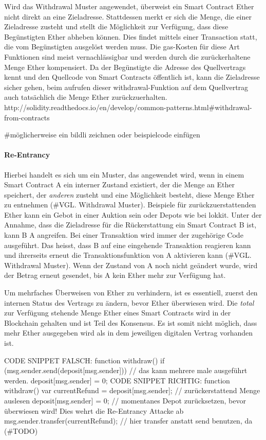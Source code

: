 Wird das Withdrawal Muster angewendet, überweist ein Smart Contract Ether nicht direkt an eine Zieladresse. Stattdessen merkt er sich die Menge, die einer Zieladresse zusteht und stellt die Möglichkeit zur Verfügung, dass diese Begünstigten Ether abheben können. Dies findet mittels einer Transaction statt, die vom Begünstigten ausgelöst werden muss. Die gas-Kosten für diese Art Funktionen sind meist vernachlässigbar und werden durch die zurückerhaltene Menge Ether kompensiert. Da der Begünstigte die Adresse des Quellvertrags kennt und den Quellcode von Smart Contracts öffentlich ist, kann die Zieladresse sicher gehen, beim aufrufen dieser withdrawal-Funktion auf dem Quellvertrag auch tatsächlich die Menge Ether zurückzuerhalten.
http://solidity.readthedocs.io/en/develop/common-patterns.html\#withdrawal-from-contracts

\#möglicherweise ein bildli zeichnen oder beispielcode einfügen


\paragraph{Re-Entrancy}
Hierbei handelt es sich um ein Muster, das angewendet wird, wenn in einem Smart Contract A ein interner Zustand existiert, der die Menge an Ether speichert, der \emph{anderen} zusteht und eine Möglichkeit besteht, diese Menge Ether zu entnehmen (\#VGL. Withdrawal Muster). Beispiele für zurückzuerstattenden Ether kann ein Gebot in einer Auktion sein oder Depots wie bei lokkit.
Unter der Annahme, dass die Zieladresse für die Rückerstattung ein Smart Contract B ist, kann B A angreifen. Bei einer Transaktion wird immer der zugehörige Code ausgeführt. Das heisst, dass B auf eine eingehende Transaktion reagieren kann und ihrerseits erneut die Transaktionsfunktion von A aktivieren kann (\#VGL. Withdrawal Muster). Wenn der Zustand von A noch nicht geändert wurde, wird der Betrag erneut gesendet, bis A kein Ether mehr zur Verfügung hat.

Um mehrfaches Überweisen von Ether zu verhindern, ist es essentiell, zuerst den internen Status des Vertrags zu ändern, bevor Ether überwiesen wird. Die \emph{total} zur Verfügung stehende Menge Ether eines Smart Contracts wird in der Blockchain gehalten und ist Teil des Konsensus. Es ist somit nicht möglich, dass mehr Ether ausgegeben wird als in dem jeweiligen digitalen Vertrag vorhanden ist. 

CODE SNIPPET FALSCH:
    function withdraw() {
        if (msg.sender.send(deposit[msg.sender])) { // das kann mehrere male ausgeführt werden.
            deposit[msg.sender] = 0;
        }
    }
CODE SNIPPET RICHTIG:
    function withdraw() {
        var currentRefund = deposit[msg.sender]; // zurückerstattend Menge auslesen
        deposit[msg.sender] = 0; // momentanes Depot zurücksetzen, bevor überwiesen wird! Dies wehrt die Re-Entrancy Attacke ab
        msg.sender.transfer(currentRefund); // hier transfer anstatt send benutzen, da (\#TODO)
    }

